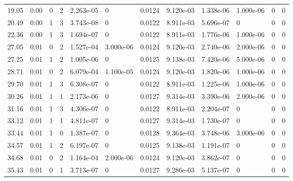 \documentclass[preview]{standalone}
\begin{document}
{{\begin{tabular}{L{1.2cm}C{1.2cm} C{0.3cm}C{0.5cm} C{1.4cm}C{1.4cm} C{1.4cm}C{1.4cm} C{1.6cm}C{1.6cm} C{1.6cm}C{1.6cm}}
  19.05  &  0.00  & 0     &  2 &  2.263e-05  & 0  &  0.0124&   9.120e-03& 1.338e-06 & 1.000e-06   &  0 & 0  \\ 
  20.49  &  0.00  & 1     &  3 &  3.743e-08  & 0  &  0.0122&   8.911e-03& 5.696e-07 & 0   &  0 & 0  \\ 
  22.36  &  0.00  & 1     &  3 &  1.694e-07  & 0  &  0.0122&   8.911e-03& 1.776e-06 & 1.000e-06   &  0 & 0  \\ 
  27.05  &  0.01  & 0     &  2 &  1.527e-04  & 3.000e-06  &  0.0124&   9.120e-03& 2.740e-06 & 2.000e-06   &  0 & 0  \\ 
  27.25  &  0.01  & 1     &  2 &  1.005e-06  & 0  &  0.0125&   9.138e-03& 7.420e-06 & 5.000e-06   &  0 & 0  \\ 
  28.71  &  0.01  & 0     &  2 &  6.079e-04  & 1.100e-05  &  0.0124&   9.120e-03& 1.820e-06 & 1.000e-06   &  0 & 0  \\ 
  29.70  &  0.01  & 1     &  3 &  6.308e-07  & 0  &  0.0122&   8.911e-03& 1.225e-06 & 1.000e-06   &  0 & 0  \\ 
  30.26  &  0.01  & 1     &  1 &  2.173e-06  & 0  &  0.0127&   9.314e-03& 3.390e-06 & 2.000e-06   &  0 & 0  \\ 
  31.16  &  0.01  & 1     &  3 &  4.306e-07  & 0  &  0.0122&   8.911e-03& 2.204e-07 & 0   &  0 & 0  \\ 
  33.12  &  0.01  & 1     &  1 &  4.811e-07  & 0  &  0.0127&   9.314e-03& 1.730e-07 & 0   &  0 & 0  \\ 
  33.44  &  0.01  & 1     &  0 &  1.387e-07  & 0  &  0.0128&   9.364e-03& 3.748e-06 & 3.000e-06   &  0 & 0  \\ 
  34.57  &  0.01  & 1     &  2 &  6.197e-07  & 0  &  0.0125&   9.138e-03& 1.191e-07 & 0   &  0 & 0  \\ 
  34.68  &  0.01  & 0     &  2 &  1.164e-04  & 2.000e-06  &  0.0124&   9.120e-03& 3.862e-07 & 0   &  0 & 0  \\ 
  35.43  &  0.01  & 0     &  1 &  3.713e-07  & 0  &  0.0127&   9.286e-03& 5.137e-07 & 0   &  0 & 0  \\ 
\hline 
\end{tabular} 

}}
\end{document}
